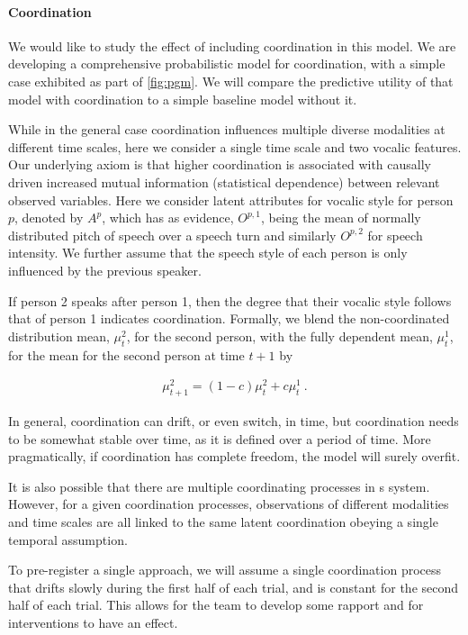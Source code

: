     \paragraph{Coordination} We would like to study the effect of including
    coordination in this model.  We are developing a comprehensive
    probabilistic model for coordination, with a simple case exhibited as part
    of \autoref{fig:pgm}.  We will compare the predictive utility of that model
    with coordination to a simple baseline model without it.

    While in the general case coordination influences multiple diverse
    modalities at different time scales, here we consider a single time scale
    and two vocalic features.  Our underlying axiom is that higher coordination
    is associated with causally driven increased mutual information (statistical
    dependence) between relevant observed variables. Here we consider latent
    attributes for vocalic style for person $p$, denoted by $A^{p}$, which has
    as evidence, $O^{p,1}$, being the mean of normally distributed pitch of
    speech over a speech turn and similarly $O^{p,2}$ for speech intensity.  We
    further assume that the speech style of each person is only influenced by
    the previous speaker.

    If person 2 speaks after person 1, then the degree that their vocalic style
    follows that of person 1 indicates coordination. Formally, we blend the
    non-coordinated distribution mean, $\mu^2_t$, for the second person, with
    the fully dependent mean, $\mu^1_t$, for the mean for the second person at
    time $t+1$ by

    \begin{align}
        \mu^2_{t+1} = (1-c) \mu^2_t + c\mu^1_t ~.
    \end{align}

    In general, coordination can drift, or even switch, in time, but
    coordination needs to be somewhat stable over time, as it is defined over a
    period of time. More pragmatically, if coordination has complete freedom,
    the model will surely overfit. 

    It is also possible that there are multiple coordinating processes in s
    system. However, for a given coordination processes, observations of
    different modalities and time scales are all linked to the same latent
    coordination obeying a single temporal assumption. 

    To pre-register a single approach, we will assume a single coordination
    process that drifts slowly during the first half of each trial, and is
    constant for the second half of each trial. This allows for the team to
    develop some rapport and for interventions to have an effect. 

